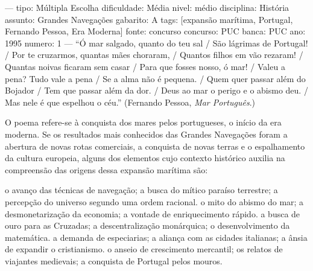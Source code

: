 
---
tipo: Múltipla Escolha
dificuldade: Média
nivel: médio
disciplina: História
assunto: Grandes Navegações
gabarito: A
tags: [expansão marítima, Portugal, Fernando Pessoa, Era Moderna]
fonte: concurso
concurso: PUC
banca: PUC
ano: 1995
numero: 1
---
\question
``Ó mar salgado, quanto do teu sal / São lágrimas de Portugal! / Por te cruzarmos, quantas mães choraram, / Quantos filhos em vão rezaram! / Quantas noivas ficaram sem casar / Para que fosses nosso, ó mar! / Valeu a pena? Tudo vale a pena / Se a alma não é pequena. / Quem quer passar além do Bojador / Tem que passar além da dor. / Deus ao mar o perigo e o abismo deu. / Mas nele é que espelhou o céu.'' (Fernando Pessoa, \textit{Mar Português}.)

O poema refere-se à conquista dos mares pelos portugueses, o início da era moderna. Se os resultados mais conhecidos das Grandes Navegações foram a abertura de novas rotas comerciais, a conquista de novas terras e o espalhamento da cultura europeia, alguns dos elementos cujo contexto histórico auxilia na compreensão das origens dessa expansão marítima são:
\begin{choices}
\CorrectChoice o avanço das técnicas de navegação; a busca do mítico paraíso terrestre; a percepção do universo segundo uma ordem racional.
\choice o mito do abismo do mar; a desmonetarização da economia; a vontade de enriquecimento rápido.
\choice a busca de ouro para as Cruzadas; a descentralização monárquica; o desenvolvimento da matemática.
\choice a demanda de especiarias; a aliança com as cidades italianas; a ânsia de expandir o cristianismo.
\choice o anseio de crescimento mercantil; os relatos de viajantes medievais; a conquista de Portugal pelos mouros.
\end{choices}

